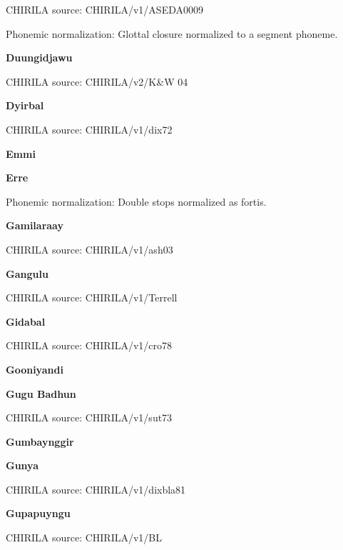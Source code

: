 CHIRILA source: CHIRILA/v1/ASEDA0009


Phonemic normalization: Glottal closure normalized to a segment phoneme.

\textbf{Duungidjawu}

CHIRILA source: CHIRILA/v2/K\&W 04


\textbf{Dyirbal}

CHIRILA source: CHIRILA/v1/dix72


\textbf{Emmi}


\textbf{Erre}


Phonemic normalization: Double stops normalized as fortis.

\textbf{Gamilaraay}

CHIRILA source: CHIRILA/v1/ash03


\textbf{Gangulu}

CHIRILA source: CHIRILA/v1/Terrell


\textbf{Gidabal}

CHIRILA source: CHIRILA/v1/cro78


\textbf{Gooniyandi}


\textbf{Gugu Badhun}

CHIRILA source: CHIRILA/v1/sut73


\textbf{Gumbaynggir}


\textbf{Gunya}

CHIRILA source: CHIRILA/v1/dixbla81


\textbf{Gupapuyngu}

CHIRILA source: CHIRILA/v1/BL


